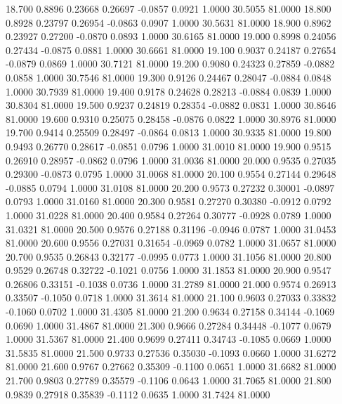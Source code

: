   18.700   0.8896   0.23668   0.26697  -0.0857   0.0921   1.0000  30.5055  81.0000
  18.800   0.8928   0.23797   0.26954  -0.0863   0.0907   1.0000  30.5631  81.0000
  18.900   0.8962   0.23927   0.27200  -0.0870   0.0893   1.0000  30.6165  81.0000
  19.000   0.8998   0.24056   0.27434  -0.0875   0.0881   1.0000  30.6661  81.0000
  19.100   0.9037   0.24187   0.27654  -0.0879   0.0869   1.0000  30.7121  81.0000
  19.200   0.9080   0.24323   0.27859  -0.0882   0.0858   1.0000  30.7546  81.0000
  19.300   0.9126   0.24467   0.28047  -0.0884   0.0848   1.0000  30.7939  81.0000
  19.400   0.9178   0.24628   0.28213  -0.0884   0.0839   1.0000  30.8304  81.0000
  19.500   0.9237   0.24819   0.28354  -0.0882   0.0831   1.0000  30.8646  81.0000
  19.600   0.9310   0.25075   0.28458  -0.0876   0.0822   1.0000  30.8976  81.0000
  19.700   0.9414   0.25509   0.28497  -0.0864   0.0813   1.0000  30.9335  81.0000
  19.800   0.9493   0.26770   0.28617  -0.0851   0.0796   1.0000  31.0010  81.0000
  19.900   0.9515   0.26910   0.28957  -0.0862   0.0796   1.0000  31.0036  81.0000
  20.000   0.9535   0.27035   0.29300  -0.0873   0.0795   1.0000  31.0068  81.0000
  20.100   0.9554   0.27144   0.29648  -0.0885   0.0794   1.0000  31.0108  81.0000
  20.200   0.9573   0.27232   0.30001  -0.0897   0.0793   1.0000  31.0160  81.0000
  20.300   0.9581   0.27270   0.30380  -0.0912   0.0792   1.0000  31.0228  81.0000
  20.400   0.9584   0.27264   0.30777  -0.0928   0.0789   1.0000  31.0321  81.0000
  20.500   0.9576   0.27188   0.31196  -0.0946   0.0787   1.0000  31.0453  81.0000
  20.600   0.9556   0.27031   0.31654  -0.0969   0.0782   1.0000  31.0657  81.0000
  20.700   0.9535   0.26843   0.32177  -0.0995   0.0773   1.0000  31.1056  81.0000
  20.800   0.9529   0.26748   0.32722  -0.1021   0.0756   1.0000  31.1853  81.0000
  20.900   0.9547   0.26806   0.33151  -0.1038   0.0736   1.0000  31.2789  81.0000
  21.000   0.9574   0.26913   0.33507  -0.1050   0.0718   1.0000  31.3614  81.0000
  21.100   0.9603   0.27033   0.33832  -0.1060   0.0702   1.0000  31.4305  81.0000
  21.200   0.9634   0.27158   0.34144  -0.1069   0.0690   1.0000  31.4867  81.0000
  21.300   0.9666   0.27284   0.34448  -0.1077   0.0679   1.0000  31.5367  81.0000
  21.400   0.9699   0.27411   0.34743  -0.1085   0.0669   1.0000  31.5835  81.0000
  21.500   0.9733   0.27536   0.35030  -0.1093   0.0660   1.0000  31.6272  81.0000
  21.600   0.9767   0.27662   0.35309  -0.1100   0.0651   1.0000  31.6682  81.0000
  21.700   0.9803   0.27789   0.35579  -0.1106   0.0643   1.0000  31.7065  81.0000
  21.800   0.9839   0.27918   0.35839  -0.1112   0.0635   1.0000  31.7424  81.0000
